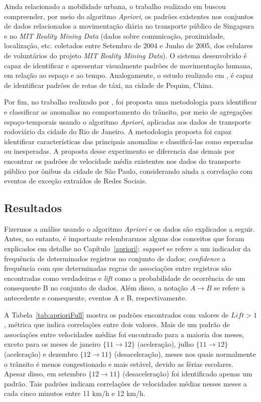 \documentclass[
	12pt,				%
	oneside,			%
	a4paper,			%
	english,			%
	brazil				%
	]{abntex2ppgsi}
\begin{document}
{{Ainda relacionado a mobilidade urbana, o trabalho realizado em \cite{zeng2017visual} buscou compreender, por meio do algoritmo \textit{Apriori}, os padrões existentes nos conjuntos de dados relacionados a movimentação diária no transporte público de Singapura e no \textit{MIT Reality Mining Data} (dados sobre comunicação, proximidade, localização, etc. coletados entre Setembro de 2004 e Junho de 2005, dos celulares de voluntários do projeto \textit{MIT Reality Mining Data}). O sistema desenvolvido é capaz de identificar e apresentar visualmente padrões de movimentação humana, em relação ao espaço e ao tempo. Analogamente, o estudo realizado em \cite{yu2018discovering}, é capaz de identificar padrões de rotas de táxi, na cidade de Pequim, China.

Por fim, no trabalho realizado por \cite{cruz2018detecccao}, foi proposta uma metodologia para identificar e classificar as anomalias no comportamento do trânsito, por meio de agregações espaço-temporais usando o algoritmo \textit{Apriori}, aplicadas aos dados de transporte rodoviário  da cidade do Rio de Janeiro. A metodologia proposta foi capaz identificar características das principais anomalias e classificá-las como esperadas ou inesperadas. A proposta desse experimento se diferencia das demais por encontrar os padrões de velocidade média existentes nos dados do transporte público por ônibus da cidade de São Paulo, considerando ainda a correlação com eventos de exceção extraídos de Redes Sociais.

\subsection{Resultados}

Fizermos a análise usando o algoritmo \textit{Apriori} e os dados são explicados a seguir. Antes, no entanto, é importante relembrarmos  alguns dos conceitos que foram explicados em detalhe no Capítulo~\ref{apriori}:  \textit{support} se refere a um indicador da frequência de determinados registros no conjunto de dados; \textit{confidence} a frequência com que determinadas regras de associações entre registros são encontradas como verdadeiras e \textit{lift} como a probabilidade de ocorrência de um consequente B no conjunto de dados. Além disso, a  notação $A \rightarrow B$ se refere a antecedente e consequente, eventos A e B, respectivamente.

A Tabela~\ref{tab:aprioriFull} mostra os padrões encontrados com valores de $\textit{Lift} > 1$, métrica que indica correlações entre dois valores. Mais de um padrão de associações entre velocidades médias foi encontrado para a maioria dos meses, exceto para os meses de janeiro $\lbrace 11 \rightarrow 12 \rbrace$ (aceleração), julho $\lbrace 11 \rightarrow 12\rbrace$ (aceleração) e dezembro $\lbrace12 \rightarrow 11\rbrace$ (desaceleração), meses nos quais normalmente o trânsito é menos congestionado e mais estável, devido as férias escolares. Apesar disso, em setembro $\lbrace12 \rightarrow 11\rbrace$ (desaceleração) foi identificado apenas um padrão. Tais padrões indicam correlações de velocidades médias nesses meses a cada cinco minutos entre 11 km/h e 12 km/h. 

}}
\end{document}
